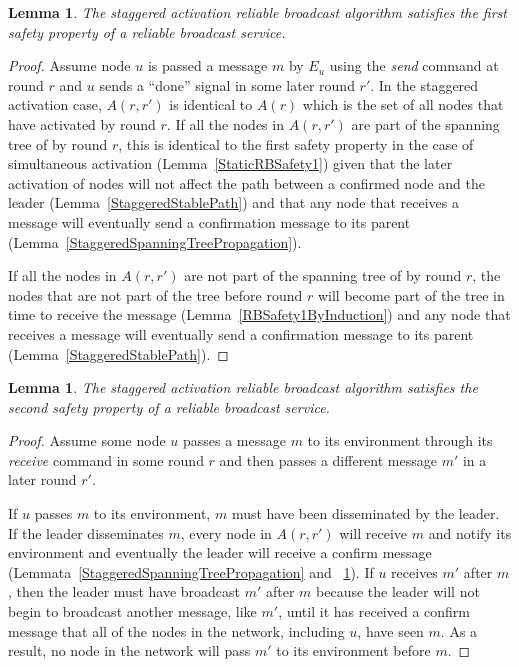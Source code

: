 \documentclass[english]{article}
\newtheorem{lemma}[theorem]{Lemma}
\begin{document}
\begin{lemma}
\label{StaggeredRBSafety1}
The staggered activation reliable broadcast algorithm satisfies the first safety property of a reliable broadcast service.
\end{lemma}
\begin{proof}

Assume node $u$ is passed a message $m$ by $E_u$ using the \textit{send} command at round $r$ and $u$ sends  a ``done'' signal in some later round $r'$.
In the staggered activation case, $A(r,r')$ is identical to $A(r)$ which is the set of all nodes that have activated by round $r$. If all the nodes in $A(r,r')$ are part of the spanning tree of by round $r$, this is identical to the first safety property in the case of simultaneous activation (Lemma~\ref{StaticRBSafety1}) given that the later activation of nodes will not affect the path between a confirmed node and the leader (Lemma~\ref{StaggeredStablePath}) and that any node that receives a message will eventually send a confirmation message to its parent (Lemma~\ref{StaggeredSpanningTreePropagation}). 

If all the nodes in $A(r,r')$ are not part of the spanning tree of by round $r$, the nodes that are not part of the tree before round $r$ will become part of the tree in time to receive the message (Lemma~\ref{RBSafety1ByInduction}) and any node that receives a message will eventually send a confirmation message to its parent (Lemma~\ref{StaggeredStablePath}).

\end{proof}


\begin{lemma}
\label{StaggeredRBSafety2}
The staggered activation reliable broadcast algorithm satisfies the second safety property of a reliable broadcast service.
\end{lemma}
\begin{proof}

Assume some node $u$ passes a message $m$ to its environment through its \textit{receive} command in some round $r$ and then passes a different message $m'$ in a later round $r'$. 

If $u$ passes $m$ to its environment, $m$ must have been disseminated by the leader. If the leader disseminates $m$, every node in $A(r,r')$ will receive $m$ and notify its environment and eventually the leader will receive a confirm message (Lemmata~\ref{StaggeredSpanningTreePropagation} and ~\ref{StaggeredRBSafety1}). If $u$ receives $m'$ after $m$, then the leader must have broadcast $m'$ after $m$ because the leader will not begin to broadcast another message, like $m'$, until it has received a confirm message that all of the nodes in the network, including $u$, have seen $m$. As a result, no node in the network will pass $m'$ to its environment before $m$.

\end{proof}
\end{document}
